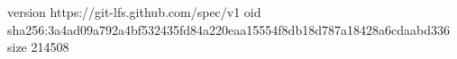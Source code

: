 version https://git-lfs.github.com/spec/v1
oid sha256:3a4ad09a792a4bf532435fd84a220eaa15554f8db18d787a18428a6cdaabd336
size 214508

